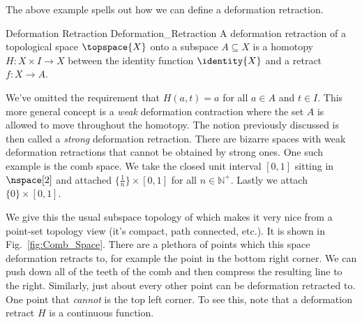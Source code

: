\documentclass{book}                                                           %
\begin{document}
                The above example spells out how we can define a deformation
                retraction.
                \begin{fdefinition}{Deformation Retraction}
                                   {Deformation_Retraction}
                    A deformation retraction of a topological space
                    $\topspace{X}$ onto a subspace $A\subseteq{X}$ is a
                    homotopy $H:X\times{I}\rightarrow{X}$ between the identity
                    function $\identity{X}$ and a retract $f:X\rightarrow{A}$.
                \end{fdefinition}
                We've omitted the requirement that $H(a,t)=a$ for all $a\in{A}$
                and $t\in{I}$. This more general concept is a \textit{weak}
                deformation contraction where the set $A$ is
                allowed to move throughout the homotopy. The notion previously
                discussed is then called a \textit{strong} deformation
                retraction. There are bizarre spaces with weak deformation
                retractions that cannot be obtained by strong ones. One such
                example is the comb space. We take the closed unit
                interval $[0,1]$ sitting in $\nspace[2]$ and attached
                $\{\frac{1}{n}\}\times[0,1]$ for all $n\in\mathbb{N}^{+}$.
                Lastly we attach $\{0\}\times[0,1]$.
                \par\hfill\par
                \begin{minipage}[t]{0.54\textwidth}
                    We give this the usual subspace topology of which makes it
                    very nice from a point-set topology view (it's compact, path
                    connected, etc.). It is shown in Fig.~\ref{fig:Comb_Space}.
                    There are a plethora of points which this space deformation
                    retracts to, for example the point in the bottom right
                    corner. We can push down all of the teeth of the comb and
                    then compress the resulting line to the right. Similarly,
                    just about every other point can be deformation retracted
                    to. One point that \textit{cannot} is the top left corner.
                    To see this, note that a deformation retract $H$ is a
                    continuous function.
                \end{minipage}
                \hfill
\end{document}
